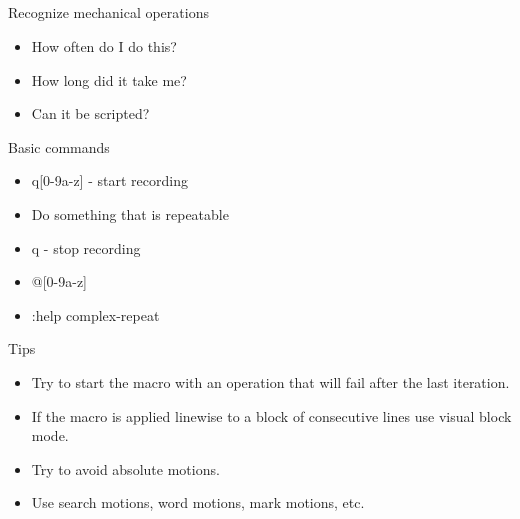\documentclass{beamer}
\begin{document}
    \subsection{}
    \begin{frame}{Recognize mechanical operations}
        \begin{itemize}
            \item How often do I do this?
            \item How long did it take me?
            \item Can it be scripted?
        \end{itemize}
    \end{frame}
    \begin{frame}{Basic commands}
        \begin{itemize}
            \item q[0-9a-z] - start recording
            \item Do something that is repeatable
            \item q - stop recording
            \item @[0-9a-z]
            \item :help complex-repeat
        \end{itemize}
    \end{frame}
    \begin{frame}{Tips}
        \begin{itemize}
            \item Try to start the macro with an operation that will fail after the last iteration.
            \item If the macro is applied linewise to a block of consecutive lines use visual block mode.
            \item Try to avoid absolute motions.
            \item Use search motions, word motions, mark motions, etc.
        \end{itemize}
    \end{frame}
\end{document}
